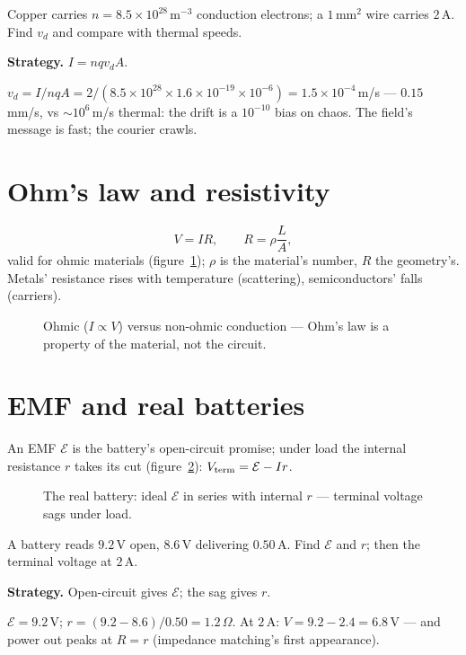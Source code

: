 \begin{example}\label{ex:drift}
Copper carries $n=8.5\times10^{28}$\,m$^{-3}$ conduction electrons; a
$1$\,mm$^{2}$ wire carries $2$\,A. Find $v_d$ and compare with thermal
speeds.
\par\smallskip
\textbf{Strategy.} $I=nqv_dA$.
\begin{solution}
$v_d=I/nqA=2/(8.5\times10^{28}\times1.6\times10^{-19}\times10^{-6})
=1.5\times10^{-4}$\,m/s --- $0.15$\,mm/s, vs $\sim10^{6}$\,m/s thermal:
the drift is a $10^{-10}$ bias on chaos. The field's message is fast;
the courier crawls. \checkmark
\end{solution}
\end{example}

\section{Ohm's law and resistivity}\label{sec:cir-ohm}

\begin{equation}
  V=IR,\qquad R=\rho\frac{L}{A},\label{eq:ohm}
\end{equation}
valid for ohmic materials (figure~\ref{fig:iv}); $\rho$ is the
material's number, $R$ the geometry's. Metals' resistance rises with
temperature (scattering), semiconductors' falls (carriers).

\begin{figure}[htbp]\centering

\caption{Ohmic ($I\propto V$) versus non-ohmic conduction --- Ohm's
law is a property of the material, not the circuit.}
\label{fig:iv}
\end{figure}

\section{EMF and real batteries}\label{sec:cir-emf}

An EMF $\mathcal E$ is the battery's open-circuit promise; under load
the internal resistance $r$ takes its cut (figure~\ref{fig:batt}):
$V_{\rm term}=\mathcal E-Ir$.

\begin{figure}[htbp]\centering

\caption{The real battery: ideal $\mathcal E$ in series with internal
$r$ --- terminal voltage sags under load.}
\label{fig:batt}
\end{figure}

\begin{example}\label{ex:internal}
A battery reads $9.2$\,V open, $8.6$\,V delivering $0.50$\,A. Find
$\mathcal E$ and $r$; then the terminal voltage at $2$\,A.
\par\smallskip
\textbf{Strategy.} Open-circuit gives $\mathcal E$; the sag gives $r$.
\begin{solution}
$\mathcal E=9.2$\,V; $r=(9.2-8.6)/0.50=1.2\,\Omega$.
At $2$\,A: $V=9.2-2.4=6.8$\,V --- and power out peaks at
$R=r$ (impedance matching's first appearance). \checkmark
\end{solution}
\end{example}

